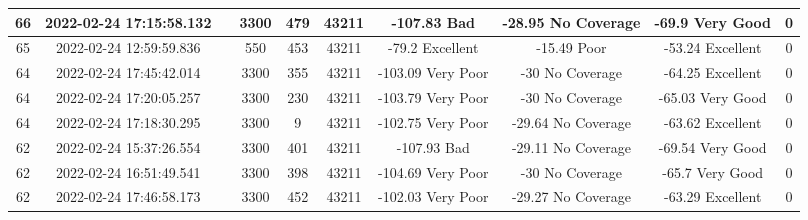\begin{longtable*}{|c|c|c|c|c|c|c|c|c|c|}
66&2022-02-24 17:15:58.132&&3300&479&43211& -107.83   Bad         & -28.95    No Coverage & -69.9     Very Good   & 0\\\hline
{}65&2022-02-24 12:59:59.836&&550&453&43211& -79.2     Excellent   & -15.49    Poor        & -53.24    Excellent   & 0\\\hline
{}64&2022-02-24 17:45:42.014&&3300&355&43211& -103.09   Very Poor   & -30       No Coverage & -64.25    Excellent   & 0\\\hline
{}64&2022-02-24 17:20:05.257&&3300&230&43211& -103.79   Very Poor   & -30       No Coverage & -65.03    Very Good   & 0\\\hline
{}64&2022-02-24 17:18:30.295&&3300&9&43211& -102.75   Very Poor   & -29.64    No Coverage & -63.62    Excellent   & 0\\\hline
{}62&2022-02-24 15:37:26.554&&3300&401&43211& -107.93   Bad         & -29.11    No Coverage & -69.54    Very Good   & 0\\\hline
{}62&2022-02-24 16:51:49.541&&3300&398&43211& -104.69   Very Poor   & -30       No Coverage & -65.7     Very Good   & 0\\\hline
{}62&2022-02-24 17:46:58.173&&3300&452&43211& -102.03   Very Poor   & -29.27    No Coverage & -63.29    Excellent   & 0\\\hline

\end{longtable*}
